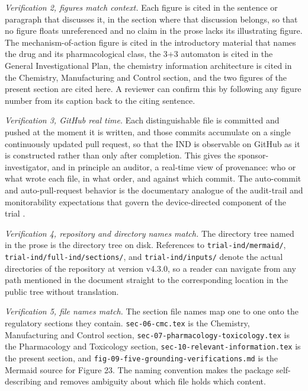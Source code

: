 \textit{Verification 2, figures match context.} Each figure is cited in the
sentence or paragraph that discusses it, in the section where that discussion
belongs, so that no figure floats unreferenced and no claim in the prose lacks its
illustrating figure. The mechanism-of-action figure is cited in the introductory
material that names the drug and its pharmacological class, the 3+3 automaton is
cited in the General Investigational Plan, the chemistry information architecture
is cited in the Chemistry, Manufacturing and Control section, and the two figures
of the present section are cited here. A reviewer can confirm this by following any
figure number from its caption back to the citing sentence.

\textit{Verification 3, GitHub real time.} Each distinguishable file is committed
and pushed at the moment it is written, and those commits accumulate on a single
continuously updated pull request, so that the IND is observable on GitHub as it is
constructed rather than only after completion. This gives the sponsor-investigator,
and in principle an auditor, a real-time view of provenance: who or what wrote each
file, in what order, and against which commit. The auto-commit and auto-pull-request
behavior is the documentary analogue of the audit-trail and monitorability
expectations that govern the device-directed component of the trial \cite{paiautospons,
paisitedocpk}.

\textit{Verification 4, repository and directory names match.} The directory tree
named in the prose is the directory tree on disk. References to
\texttt{trial-ind/mermaid/}, \texttt{trial-ind/full-ind/sections/}, and
\texttt{trial-ind/inputs/} denote the actual directories of the repository at
version v4.3.0, so a reader can navigate from any path mentioned in the document
straight to the corresponding location in the public tree without translation.

\textit{Verification 5, file names match.} The section file names map one to one
onto the regulatory sections they contain. \texttt{sec-06-cmc.tex} is the
Chemistry, Manufacturing and Control section, \texttt{sec-07-pharmacology-toxicology.tex}
is the Pharmacology and Toxicology section, \texttt{sec-10-relevant-information.tex}
is the present section, and \texttt{fig-09-five-grounding-verifications.md} is the
Mermaid source for Figure 23. The naming convention makes the package
self-describing and removes ambiguity about which file holds which content.

